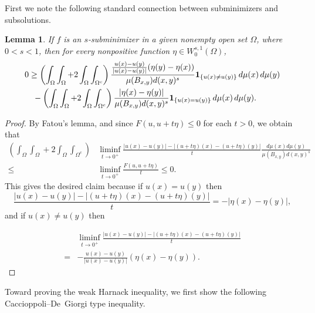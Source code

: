 \documentclass[11pt,leqno]{amsart}
\newtheorem{lemma}[theorem]{Lemma}
\numberwithin{equation}{section}
\theoremstyle{definition}
\begin{document}
	
	First we note the following standard connection between subminimizers and subsolutions.
	\begin{lemma}\label{lem1.3-1oct}
		If $f$ is an $s$-subminimizer 
		{in a given nonempty open set $\Omega$,}
		where $0<s<1$, then
		for every nonpositive  function  $\eta\in W^{s,1}_0(\Omega)$,
		{
			\begin{align*}
				&0\geq  \left( \int_\Omega\int_\Omega +2\int_\Omega\int_{\Omega^c} \right) \frac{ \frac{u(x)-u(y)}{|u(x)-u(y)|} (\eta(y)-\eta(x)) }{\mu(B_{x,y}) d(x,y)^s} 
				{\bf 1}_{\{ u(x)\neq u(y)\}} \,d\mu(x)\,d\mu(y)\\
				&\quad  - \left( \int_\Omega\int_\Omega +2\int_\Omega\int_{\Omega^c} \right) \frac{  |\eta(x)-\eta(y)| }{\mu(B_{x,y}) d(x,y)^s} {\bf 1}_{\{ u(x)= u(y)\}} \,d\mu(x)\,d\mu(y).
			\end{align*}
		}
		
	\end{lemma}
	\begin{proof}
		By Fatou's lemma, and since $F(u, u+t\eta)\leq 0$ for each $t>0$, we obtain that
		\begin{align*}
			\left( \int_\Omega\int_\Omega +2\int_\Omega\int_{\Omega^c} \right) &  \liminf_{t\to 0^+} \frac{{|u(x)-u(y)| - |(u+t\eta)(x)-(u+t\eta)(y)| }}{t} \frac{d\mu(x)d\mu(y)}{\mu(B_{x,y})d(x,y)^s} \\
			\leq & \liminf_{t\to 0^+} \frac{F(u,u+t\eta)}{t} \leq 0.
		\end{align*}
		This gives the desired claim because if $u(x)= u(y)$ then 
		\[
		\frac{{|u(x)-u(y)| - |(u+t\eta)(x)-(u+t\eta)(y)| }}{t} =-|\eta(x)-\eta(y)|,
		\]
		and if $u(x)\neq u(y)$ then
		
		\begin{align*}
			&  \liminf_{t\to 0^+}  \frac{{|u(x)-u(y)| - |(u+t\eta)(x)-(u+t\eta)(y)| }}{t} \\
			=&	-\frac{ u(x)-u(y)}{ |u(x)-u(y)| } (\eta(x)-\eta(y)).
		\end{align*}
	\end{proof}
	
	Toward proving the weak Harnack inequality, we first show the following
	Caccioppoli--De~Giorgi type inequality.
	
\end{document}
